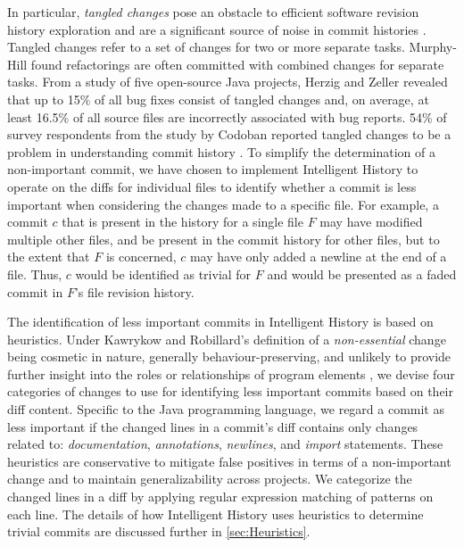 In particular, \emph{tangled changes} pose an obstacle to efficient software revision history exploration 
and are a significant source of noise in commit histories \cite{herzig_tangled_2013}.
Tangled changes refer to a set of changes for two or more separate tasks. 
Murphy-Hill \etal \cite{murphy-hill_refactor_2012} found refactorings are often committed with combined changes for separate tasks. 
From a study of five open-source Java projects, Herzig and Zeller \cite{herzig_tangled_2013} 
revealed that up to 15\% of all bug fixes consist of tangled changes and, 
on average, at least 16.5\% of all source files are incorrectly associated with bug reports. 
54\% of survey respondents from the study by Codoban \etal reported tangled changes to be a problem
in understanding commit history \cite{codoban_software_2015}.
To simplify the determination of a non-important commit, we have chosen to implement Intelligent History to operate on
the diffs for individual files to identify whether a commit is less important when considering the changes made to a specific file. 
For example, a commit $c$ that is present in the history for a single file $F$ may have modified multiple other files, 
and be present in the commit history for other files, but to the extent that $F$ is concerned, 
$c$ may have only added a newline at the end of a file.
Thus, $c$ would be identified as trivial for $F$ and would be presented as a faded commit in $F$'s file revision history.

The identification of less important commits in Intelligent History is based on heuristics.
Under Kawrykow and Robillard's definition of a \emph{non-essential} change being cosmetic in nature, 
generally behaviour-preserving, and unlikely to provide further insight into the roles or relationships of program elements \cite{kawrykow_non-essential_2011}, 
we devise four categories of changes to use for identifying less important commits based on their diff content.
Specific to the Java programming language, we regard a commit as less important if the changed lines in a commit's diff contains only changes related to: 
\emph{documentation}, \emph{annotations}, \emph{newlines}, and \emph{import} statements.
These heuristics are conservative to mitigate false positives in terms of a non-important change and to maintain generalizability across projects.
We categorize the changed lines in a diff by applying regular expression matching of patterns on each line.
The details of how Intelligent History uses heuristics to determine trivial commits are discussed further in \autoref{sec:Heuristics}.


